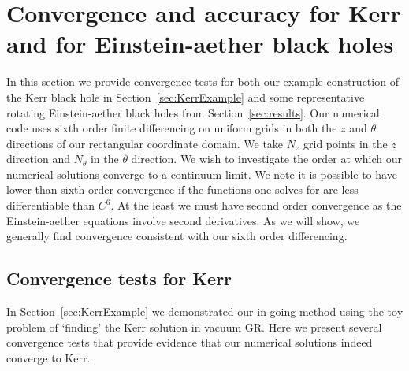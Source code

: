 \documentclass[12pt]{article}
\numberwithin{equation}{section}
\begin{document}
\section{Convergence and accuracy for Kerr and for Einstein-aether black holes}
\label{app:conv}

In this section we provide convergence tests for both our example construction of the Kerr black hole in Section~\ref{sec:KerrExample} and some representative rotating Einstein-aether black holes from Section~\ref{sec:results}. Our numerical code uses sixth order finite differencing on uniform grids in both the $z$ and $\theta$ directions of our rectangular coordinate domain. We take $N_z$ grid points in the $z$ direction and $N_\theta$ in the $\theta$ direction. We wish to investigate the order at which our numerical solutions converge to a continuum limit. We note it is possible to have lower than sixth order convergence if the functions one solves for are less differentiable than $C^6$. At the least we must have second order convergence as the Einstein-aether equations involve second derivatives. As we will show, we generally find convergence consistent with our sixth order differencing.


\subsection{Convergence tests for Kerr}

In Section~\ref{sec:KerrExample} we demonstrated our in-going method using the toy problem of `finding' the Kerr solution in vacuum GR. Here we present several convergence tests that provide evidence that our numerical solutions indeed converge to Kerr. 
\end{document}
